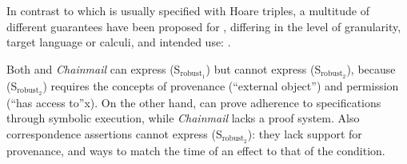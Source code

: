  
 
\vspace{.04in}
 
In contrast to   which is usually specified with %
Hoare triples,  a multitude of different guarantees have been proposed for , differing in the level 
of granularity,   target  language or calculi, and intended use:
.
 

  Both {} \cite{VerX} and  \emph{Chainmail} \cite{FASE} can express (S$_{\text{robust}_1}$) but
  {}  cannot express (S$_{\text{robust}_2}$), because 
(S$_{\text{robust}_2}$)  requires the concepts of provenance (``external object'') and
  permission (``has access to''x).
On the other hand, {} can prove adherence to  specifications through symbolic 
  execution, while  \emph{Chainmail}   lacks a proof system. 
   Also correspondence assertions cannot express (S$_{\text{robust}_2}$): they lack
    support for provenance, and ways to match the time of an effect to that of the
    condition.%
  

